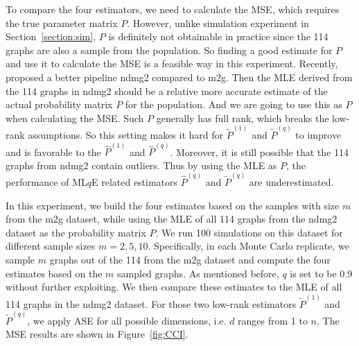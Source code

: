 \documentclass[a4paper]{article}
\renewcommand{\hat}{\widehat}
\begin{document}
To compare the four estimators, we need to calculate the MSE, which requires the true parameter matrix $P$. However, unlike simulation experiment in Section~\ref{section:sim}, $P$ is definitely not obtainable in practice since the 114 graphs are also a sample from the population. So finding a good estimate for $P$ and use it to calculate the MSE is a feasible way in this experiment. Recently, \citet{kiar2016ndmg} proposed a better pipeline ndmg2 compared to m2g. Then the MLE derived from the 114 graphs in ndmg2 should be a relative more accurate estimate of the actual probability matrix $P$ for the population. And we are going to use this as $P$ when calculating the MSE. Such $P$ generally has full rank, which breaks the low-rank assumptions. So this setting makes it hard for $\widetilde{P}^{(1)}$ and $\widetilde{P}^{(q)}$ to improve and is favorable to the $\hat{P}^{(1)}$ and $\hat{P}^{(q)}$. Moreover, it is still possible that the 114 graphs from ndmg2 contain outliers. Thus by using the MLE as $P$, the performance of ML$q$E related estimators $\hat{P}^{(q)}$ and $\widetilde{P}^{(q)}$ are underestimated.

In this experiment, we build the four estimates based on the samples with size $m$ from the m2g dataset, while using the MLE of all 114 graphs from the ndmg2 dataset as the probability matrix $P$.
We run 100 simulations on this dataset for different sample sizes $m = 2, 5, 10$. Specifically, in each Monte Carlo replicate, we sample $m$ graphs out of the 114 from the m2g dataset and compute the four estimates based on the $m$ sampled graphs. As mentioned before, $q$ is set to be 0.9 without further exploiting. We then compare these estimates to the MLE of all 114 graphs in the ndmg2 dataset.
For those two low-rank estimators $\widetilde{P}^{(1)}$ and $\widetilde{P}^{(q)}$, we apply ASE for all possible dimensions, i.e. $d$ ranges from 1 to $n$. The MSE results are shown in Figure~\ref{fig:CCI}.
\end{document}
